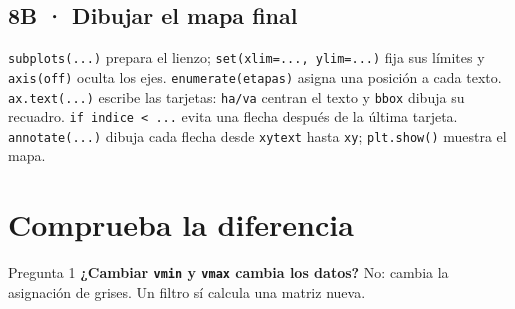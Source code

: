 
\subsection*{8B · Dibujar el mapa final}

\label{vivo:8b}

\texttt{\small subplots(\allowbreak{}.\allowbreak{}.\allowbreak{}.\allowbreak{})\allowbreak{}} prepara el lienzo; \texttt{\small set(\allowbreak{}xlim=.\allowbreak{}.\allowbreak{}.\allowbreak{},\allowbreak{} ylim=.\allowbreak{}.\allowbreak{}.\allowbreak{})\allowbreak{}} fija sus límites y \texttt{\small axis(\allowbreak{}\textquotedbl{}off\textquotedbl{})\allowbreak{}} oculta los ejes. \texttt{\small enumerate(\allowbreak{}etapas)\allowbreak{}} asigna una posición a cada texto. \texttt{\small ax.\allowbreak{}text(\allowbreak{}.\allowbreak{}.\allowbreak{}.\allowbreak{})\allowbreak{}} escribe las tarjetas: \texttt{\small ha/va} centran el texto y \texttt{\small bbox} dibuja su recuadro. \texttt{\small if indice < .\allowbreak{}.\allowbreak{}.\allowbreak{}} evita una flecha después de la última tarjeta. \texttt{\small annotate(\allowbreak{}.\allowbreak{}.\allowbreak{}.\allowbreak{})\allowbreak{}} dibuja cada flecha desde \texttt{\small xytext} hasta \texttt{\small xy}; \texttt{\small plt.\allowbreak{}show(\allowbreak{})\allowbreak{}} muestra el mapa.




\clearpage

\section*{Comprueba la diferencia}

\begin{Practica}{Pregunta 1}
\textbf{¿Cambiar \texttt{vmin} y \texttt{vmax} cambia los datos?} No: cambia la asignación de grises. Un filtro sí calcula una matriz nueva.
\end{Practica}

